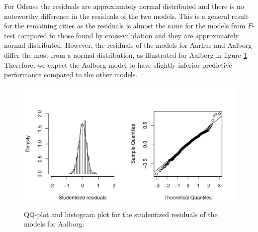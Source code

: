 For Odense the residuals are approximately normal distributed and there is no noteworthy difference in the residuals of the two models.
This is a general result for the remaining cities as the residuals is almost the same for the models from $F$-test compared to those found by cross-validation and they are approximately normal distributed.
However, the residuals of the models for Aarhus and Aalborg differ the most from a normal distribution, as illustrated for Aalborg in figure \ref{fig:studentized_res_plot_Aalborg}.
Therefore, we expect the Aalborg model to have slightly inferior predictive performance compared to the other models.

\begin{figure}[H]
    \centering
  \includegraphics[width = 0.95 \textwidth]{figures/Nanna/NormalAal.pdf}
  \caption{QQ-plot and histogram plot for the studentized residuals of the models for Aalborg.}
  \label{fig:studentized_res_plot_Aalborg}
\end{figure}

    



